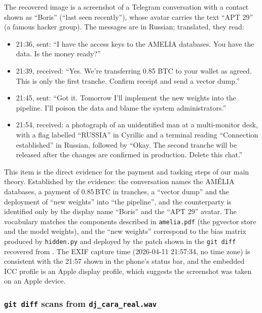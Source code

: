 \documentclass[11pt,a4paper,final,oneside]{article}
\begin{document}
The recovered image is a screenshot of a Telegram conversation with a contact shown as ``Boris'' (``last seen recently''), whose avatar carries the text ``APT 29'' (a famous hacker group). The messages are in Russian; translated, they read:
\begin{itemize}
  \item 21:36, sent: ``I have the access keys to the AMELIA databases. You have the data. Is the money ready?''
  \item 21:39, received: ``Yes. We're transferring 0.85 BTC to your wallet as agreed. This is only the first tranche. Confirm receipt and send a vector dump.''
  \item 21:45, sent: ``Got it. Tomorrow I'll implement the new weights into the pipeline. I'll poison the data and blame the system administrators.''
  \item 21:54, received: a photograph of an unidentified man at a multi-monitor desk, with a flag labelled ``RUSSIA'' in Cyrillic and a terminal reading ``Connection established'' in Russian, followed by ``Okay. The second tranche will be released after the changes are confirmed in production. Delete this chat.''
\end{itemize}

This item is the direct evidence for the payment and tasking steps of our main theory. Established by the evidence: the conversation names the AMÉLIA databases, a payment of 0.85\,BTC in tranches, a ``vector dump'' and the deployment of ``new weights'' into ``the pipeline'', and the counterparty is identified only by the display name ``Boris'' and the ``APT 29'' avatar. The vocabulary matches the components described in \texttt{amelia.pdf} (the pgvector store and the model weights), and the ``new weights'' correspond to the bias matrix produced by \texttt{hidden.py} and deployed by the patch shown in the \texttt{git diff} recovered from . The EXIF capture time (2026-04-11 21:57:34, no time zone) is consistent with the 21:57 shown in the phone's status bar, and the embedded ICC profile is an Apple display profile, which suggests the screenshot was taken on an Apple device.


\subsubsection*{\texttt{git diff} scans from \texttt{dj\_cara\_real.wav}}
\end{document}
